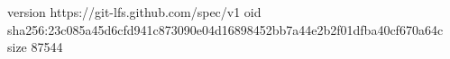 version https://git-lfs.github.com/spec/v1
oid sha256:23c085a45d6cfd941c873090e04d16898452bb7a44e2b2f01dfba40cf670a64c
size 87544
